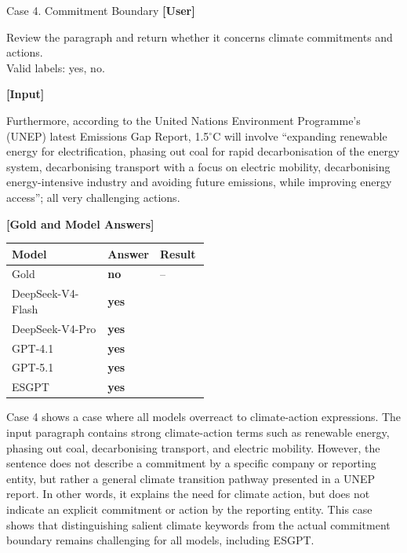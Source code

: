 \documentclass[11pt]{article}
\newcommand{\xmarkred}{\textcolor{casered}{\ding{55}}}
\newcommand{\goldans}[1]{\textbf{#1}}
\newcommand{\wrongans}[1]{\textcolor{casered}{\textbf{#1}}}
\begin{document}
\begin{qualcasebox}{Case 4. Commitment Boundary}
\small
\textbf{[User]}

\footnotesize
Review the paragraph and return whether it concerns climate commitments and actions.\\
Valid labels: yes, no.

\vspace{0.6em}
\textbf{[Input]}

\footnotesize
Furthermore, according to the United Nations Environment Programme's (UNEP) latest Emissions Gap Report, 1.5$^\circ$C will involve ``expanding renewable energy for electrification, phasing out coal for rapid decarbonisation of the energy system, decarbonising transport with a focus on electric mobility, decarbonising energy-intensive industry and avoiding future emissions, while improving energy access''; all very challenging actions.

\tcblower

\small
\textbf{[Gold and Model Answers]}

\vspace{0.2em}
\footnotesize
\begin{tabularx}{1.0\linewidth}{@{}Y C{0.25\linewidth} C{0.25\linewidth}@{}}
\hline
\textbf{Model} & \textbf{Answer} & \textbf{Result} \\
\hline
Gold & \goldans{no} & -- \\
\hline
DeepSeek-V4-Flash & \wrongans{yes} & \xmarkred \\
DeepSeek-V4-Pro & \wrongans{yes} & \xmarkred \\
GPT-4.1 & \wrongans{yes} & \xmarkred \\
GPT-5.1 & \wrongans{yes} & \xmarkred \\
\textsf{ESGPT} & \wrongans{yes} & \xmarkred \\
\hline
\end{tabularx}
\end{qualcasebox}
Case 4 shows a case where all models overreact to climate-action expressions. The input paragraph contains strong climate-action terms such as renewable energy, phasing out coal, decarbonising transport, and electric mobility. However, the sentence does not describe a commitment by a specific company or reporting entity, but rather a general climate transition pathway presented in a UNEP report. In other words, it explains the need for climate action, but does not indicate an explicit commitment or action by the reporting entity. This case shows that distinguishing salient climate keywords from the actual commitment boundary remains challenging for all models, including \textsf{ESGPT}.
\end{document}
